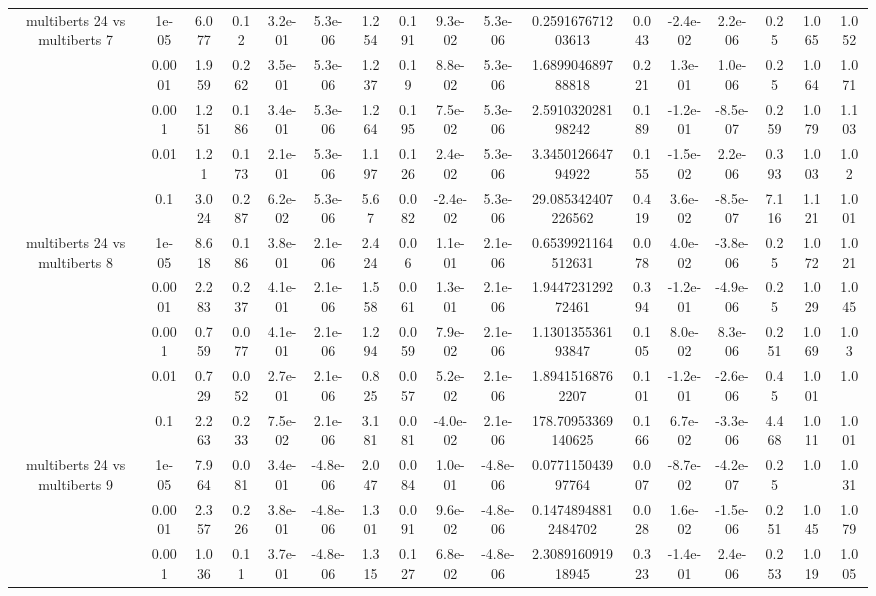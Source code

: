 \begin{tabular}{|c|c|c|c|c|c|c|c|c|c|c|c|c|c|c|c|c|}
\hline
\multirow{5}{*}{multiberts 24 vs multiberts 7} & 1e-05 & 6.077 & 0.12 & 3.2e-01 & 5.3e-06 & 1.254 & 0.191 & 9.3e-02 & 5.3e-06 & 0.259167671203613 & 0.043 & -2.4e-02 & 2.2e-06 & 0.25 & 1.065 & 1.052 \\
 & 0.0001 & 1.959 & 0.262 & 3.5e-01 & 5.3e-06 & 1.237 & 0.19 & 8.8e-02 & 5.3e-06 & 1.689904689788818 & 0.221 & 1.3e-01 & 1.0e-06 & 0.25 & 1.064 & 1.071 \\
 & 0.001 & 1.251 & 0.186 & 3.4e-01 & 5.3e-06 & 1.264 & 0.195 & 7.5e-02 & 5.3e-06 & 2.591032028198242 & 0.189 & -1.2e-01 & -8.5e-07 & 0.259 & 1.079 & 1.103 \\
 & 0.01 & 1.21 & 0.173 & 2.1e-01 & 5.3e-06 & 1.197 & 0.126 & 2.4e-02 & 5.3e-06 & 3.345012664794922 & 0.155 & -1.5e-02 & 2.2e-06 & 0.393 & 1.003 & 1.02 \\
 & 0.1 & 3.024 & 0.287 & 6.2e-02 & 5.3e-06 & 5.67 & 0.082 & -2.4e-02 & 5.3e-06 & 29.085342407226562 & 0.419 & 3.6e-02 & -8.5e-07 & 7.116 & 1.121 & 1.001 \\
\hline
\multirow{5}{*}{multiberts 24 vs multiberts 8} & 1e-05 & 8.618 & 0.186 & 3.8e-01 & 2.1e-06 & 2.424 & 0.06 & 1.1e-01 & 2.1e-06 & 0.6539921164512631 & 0.078 & 4.0e-02 & -3.8e-06 & 0.25 & 1.072 & 1.021 \\
 & 0.0001 & 2.283 & 0.237 & 4.1e-01 & 2.1e-06 & 1.558 & 0.061 & 1.3e-01 & 2.1e-06 & 1.944723129272461 & 0.394 & -1.2e-01 & -4.9e-06 & 0.25 & 1.029 & 1.045 \\
 & 0.001 & 0.759 & 0.077 & 4.1e-01 & 2.1e-06 & 1.294 & 0.059 & 7.9e-02 & 2.1e-06 & 1.130135536193847 & 0.105 & 8.0e-02 & 8.3e-06 & 0.251 & 1.069 & 1.03 \\
 & 0.01 & 0.729 & 0.052 & 2.7e-01 & 2.1e-06 & 0.825 & 0.057 & 5.2e-02 & 2.1e-06 & 1.89415168762207 & 0.101 & -1.2e-01 & -2.6e-06 & 0.45 & 1.001 & 1.0 \\
 & 0.1 & 2.263 & 0.233 & 7.5e-02 & 2.1e-06 & 3.181 & 0.081 & -4.0e-02 & 2.1e-06 & 178.70953369140625 & 0.166 & 6.7e-02 & -3.3e-06 & 4.468 & 1.011 & 1.001 \\
\hline
\multirow{5}{*}{multiberts 24 vs multiberts 9} & 1e-05 & 7.964 & 0.081 & 3.4e-01 & -4.8e-06 & 2.047 & 0.084 & 1.0e-01 & -4.8e-06 & 0.077115043997764 & 0.007 & -8.7e-02 & -4.2e-07 & 0.25 & 1.0 & 1.031 \\
 & 0.0001 & 2.357 & 0.226 & 3.8e-01 & -4.8e-06 & 1.301 & 0.091 & 9.6e-02 & -4.8e-06 & 0.14748948812484702 & 0.028 & 1.6e-02 & -1.5e-06 & 0.251 & 1.045 & 1.079 \\
 & 0.001 & 1.036 & 0.11 & 3.7e-01 & -4.8e-06 & 1.315 & 0.127 & 6.8e-02 & -4.8e-06 & 2.308916091918945 & 0.323 & -1.4e-01 & 2.4e-06 & 0.253 & 1.019 & 1.005 \\

\end{tabular}
